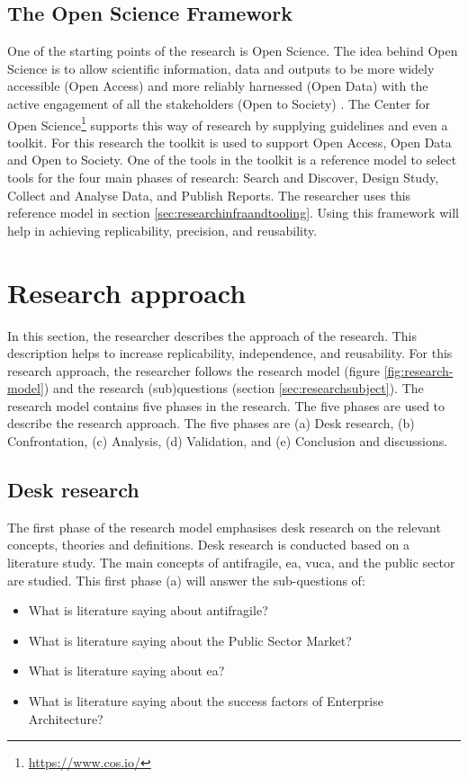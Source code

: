 \subsection{The Open Science Framework}
\label{sub:osf}
One of the starting points of the research is Open Science. The idea behind Open Science is to allow scientific information, data and outputs to be more widely accessible (Open Access) and more reliably harnessed (Open Data) with the active engagement of all the stakeholders (Open to Society) \parencite{UNESCO2020}. The Center for Open Science\footnote{{\url{https://www.cos.io/}}} supports this way of research by supplying guidelines and even a toolkit. For this research the toolkit is used to support Open Access, Open Data and Open to Society. One of the tools in the toolkit is a reference model to select tools for the four main phases of research: Search and Discover, Design Study, Collect and Analyse Data, and Publish Reports. The researcher uses this reference model in section \ref{sec:researchinfraandtooling}. Using this framework will help in achieving replicability, precision, and reusability.
\section{Research approach}
\label{sec:researchapproach}
In this section, the researcher describes the approach of the research. This description helps to increase replicability, independence, and reusability. For this research approach, the researcher follows the research model (figure \ref{fig:research-model}) and the research (sub)questions (section \ref{sec:researchsubject}). The research model contains five phases in the research. The five phases are used to describe the research approach. The five phases are (a) Desk research, (b) Confrontation, (c) Analysis, (d) Validation, and (e) Conclusion and discussions.

\subsection{Desk research}
\label{sub:deskresearchphase}
The first phase of the research model emphasises desk research on the relevant concepts, theories and definitions. Desk research is conducted based on a literature study. The main concepts of \gls{antifragile}, \acrshort{ea}, \acrshort{vuca}, and the public sector are studied. This first phase (a) will answer the sub-questions of:
\begin{itemize}
	\item{What is literature saying about \gls{antifragile}?}
	\item{What is literature saying about the Public Sector Market?}
	\item{What is literature saying about \acrlong{ea}?}
	\item{What is literature saying about the success factors of Enterprise Architecture?}
\end{itemize}

